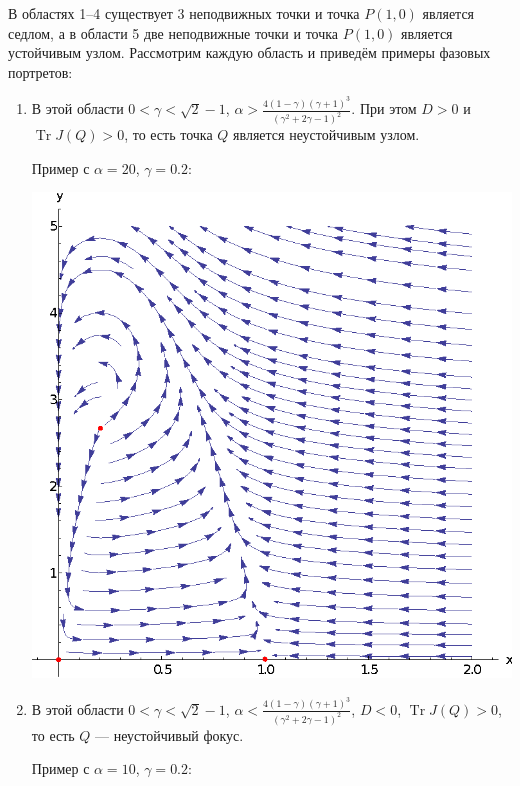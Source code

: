 \documentclass[11pt]{article}
\DeclareMathOperator{\Tr}{Tr}
\begin{document}
В областях 1--4 существует 3 неподвижных точки и точка $P(1, 0)$ является седлом, а в области 5 две неподвижные точки и точка $P(1, 0)$ является устойчивым узлом. Рассмотрим каждую область и приведём примеры фазовых портретов:
\begin{enumerate}
\item
В этой области $0 < \gamma < \sqrt{2} - 1$, $\alpha > \frac{4(1 - \gamma)(\gamma + 1)^3}{(\gamma^2 + 2\gamma - 1)^2}$. При этом $D > 0$ и $\Tr J(Q) > 0$, то есть точка $Q$ является неустойчивым узлом.

Пример с $\alpha = 20$, $\gamma = 0.2$:

\includegraphics[scale=1.0]{pics/zone1.eps}
\item
В этой области $0 < \gamma < \sqrt{2} - 1$, $\alpha < \frac{4(1 - \gamma)(\gamma + 1)^3}{(\gamma^2+2\gamma-1)^2}$, $D < 0$, $\Tr J(Q) > 0$, то есть $Q$ --- неустойчивый фокус.

Пример с $\alpha = 10$, $\gamma = 0.2$:


\end{enumerate}
\end{document}
